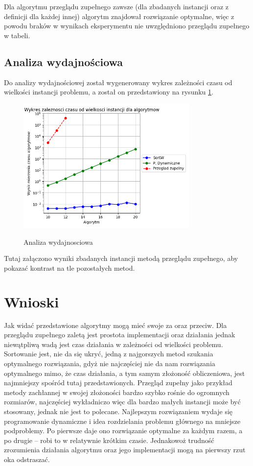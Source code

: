 \documentclass[a4paper]{article}
\begin{document}
Dla algorytmu przeglądu zupełnego zawsze (dla zbadanych instancji oraz z definicji dla każdej innej) algorytm znajdował rozwiązanie optymalne, więc z powodu braków w wynikach eksperymentu nie uwzględniono przeglądu zupełnego w tabeli.


\newpage
\subsection{Analiza wydajnościowa}
Do analizy wydajnościowej został wygenerowany wykres zależności czasu od wielkości instancji problemu, a został on przedstawiony na rysunku \ref{fig:wydajnosc}. 
\begin{figure}[h]
	\centering
	\includegraphics[width=0.8\textwidth]{Figure_1.png}
	\label{fig:wydajnosc}
	\caption{Analiza wydajnosciowa}
\end{figure}

Tutaj załączono wyniki zbadanych instancji metodą przeglądu zupełnego, aby pokazać kontrast na tle pozostałych metod.


\section{Wnioski}
Jak widać przedstawione algorytmy mogą mieć swoje za oraz przeciw. Dla przeglądu zupełnego zaletą jest prostota implementacji oraz działania jednak niewątpliwą wadą jest czas działania w zależności od wielkości problemu. Sortowanie jest, nie da się ukryć, jedną z najgorszych metod szukania optymalnego rozwiązania, gdyż nie najczęściej nie da nam rozwiązania optymalnego mimo, że czas działania, a tym samym złożoność obliczeniowa, jest najmniejszy spośród tutaj przedstawionych. Przegląd zupełny jako przykład metody zachłannej w swojej złożoności bardzo szybko rośnie do ogromnych rozmiarów, najczęściej wykładniczo więc dla bardzo małych instancji może być stosowany, jednak nie jest to polecane. Najlepszym rozwiązaniem wydaje się programowanie dynamiczne i idea rozdzielania problemu głównego na mniejsze podproblemy. Po pierwsze daje ono rozwiązanie optymalne za każdym razem, a po drugie -- robi to w relatywnie krótkim czasie. Jednakowoż trudność zrozumienia działania algorytmu oraz jego implementacji mogą na pierwszy rzut oka odstraszać.




\end{document}
